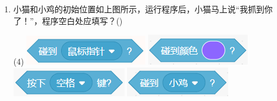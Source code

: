 \documentclass[10pt, a4paper]{article}
\newcommand{\hq}{\hfill(\qquad)}
\begin{document}
\begin{enumerate}
        \item 小猫和小鸡的初始位置如上图所示，运行程序后，小猫马上说“我抓到你了！”，程序空白处应填写？\hq
        \begin{tasks}(4)
            \task \includegraphics[width=.13\textwidth]{figure/25a.png}
            \task \includegraphics[width=.12\textwidth]{figure/25b.png}
            \task \includegraphics[width=.13\textwidth]{figure/25c.png}
            \task \includegraphics[width=.12\textwidth]{figure/25d.png}
        \end{tasks}
    \end{enumerate}
\end{document}
